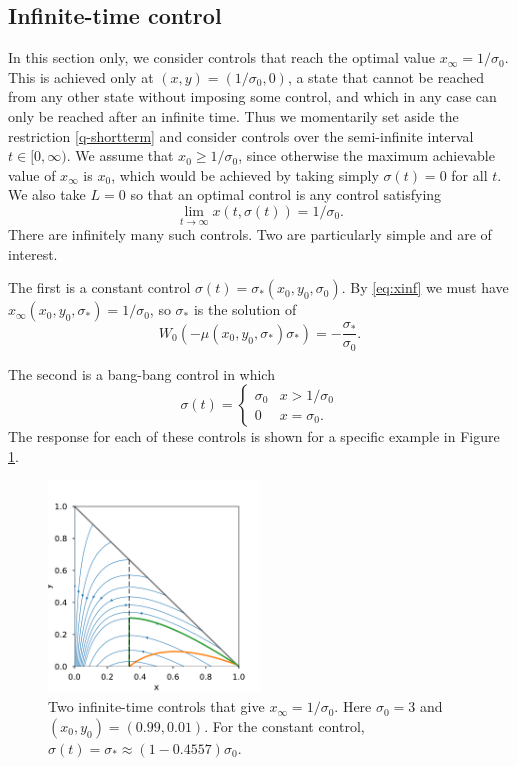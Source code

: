 \documentclass[english,12pt,letter]{article}
\newcommand{\Rnot}{\sigma_0}
\newcommand{\Sinf}{x_\infty}
\begin{document}
\subsection{Infinite-time control}
In this section only, we consider controls that reach the optimal value $\Sinf = 1/\Rnot$.
This is achieved only at $(x,y)=(1/\Rnot,0)$, a state that cannot be reached
from any other state without imposing some control, and which in any case can
only be reached after an infinite time.  Thus we momentarily set aside the restriction
\eqref{q-shortterm} and consider controls over the semi-infinite interval $t\in[0,\infty)$.
We assume that $x_0\ge1/\Rnot$, since otherwise the maximum achievable value of $\Sinf$
is $x_0$, which would be achieved by taking simply $\sigma(t)=0$ for all $t$.
We also take $L=0$ so that an optimal control is any control satisfying
$$
    \lim_{t \to \infty} x(t,\sigma(t)) = 1/\Rnot.
$$
There are infinitely many such controls.  Two are particularly simple and
are of interest.

The first is a constant control $\sigma(t) = \sigma_*(x_0, y_0, \Rnot)$.
By \eqref{eq:xinf} we must have $\Sinf(x_0,y_0,\sigma_*)=1/\Rnot$, so $\sigma_*$ is the solution of
$$
    W_0(-\mu(x_0,y_0,\sigma_*)\sigma_*) = -\frac{\sigma_*}{\sigma_0}.
$$

The second is a bang-bang control in which
$$
    \sigma(t) = \begin{cases} \Rnot & x>1/\Rnot \\ 0 & x=\Rnot. \end{cases}
$$
The response for each of these controls is shown for a specific example in
Figure \ref{fig:two-controls}.
\begin{figure}
    \centering
    \includegraphics[width=0.5\textwidth]{figures/twocontrols.pdf}
    \caption{Two infinite-time controls that give $\Sinf=1/\Rnot$.  Here $\Rnot=3$ and
        $(x_0,y_0)=(0.99,0.01)$.  For the constant control, $\sigma(t)=\sigma_*\approx(1-0.4557)\Rnot$.\label{fig:two-controls}}
\end{figure}
\end{document}
